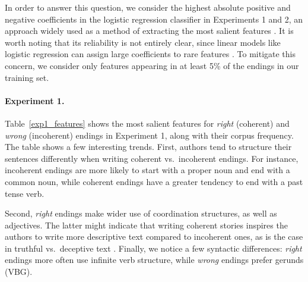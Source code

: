 \documentclass[11pt,a4paper]{article}
\newcommand{\tabref}[1]{Table~\ref{#1}}
\begin{document}
In order to answer this question, we consider the highest absolute
positive and negative coefficients in the logistic regression
classifier in Experiments 1 and 2, an approach widely used  as a
method of extracting the most salient features
\cite{Nguyen:2013,Burke:2013,Brooks:2013}. It is worth noting
  that its reliability is not entirely clear, since linear models like
  logistic regression can assign large coefficients to rare features \cite{Yano:2012}.
To mitigate this concern, we consider only features appearing in at least 5\% of the endings in our training set. 

\paragraph{Experiment 1.}
\tabref{exp1_features} shows the most salient features for {\it right} (coherent) and {\it wrong} (incoherent) endings in Experiment 1,
along with their corpus frequency. 
The table shows a few interesting trends. 
First, authors tend to structure their sentences differently when writing {coherent}  vs.~{incoherent} endings.
For instance, {incoherent} endings are more likely to start with a proper noun and end with a common noun, 
while coherent endings have a greater tendency to end with a past tense verb.

Second, {\it right} endings make wider use of coordination structures, as well as adjectives.
The latter might indicate that writing coherent stories inspires the authors to write more descriptive text compared to incoherent ones, 
as is the case in truthful vs.~deceptive text \cite{ott2011finding}.
Finally, we notice a few syntactic differences: {\it right} endings more often use infinite verb structure, while {\it wrong} endings prefer gerunds (VBG). 
\end{document}
